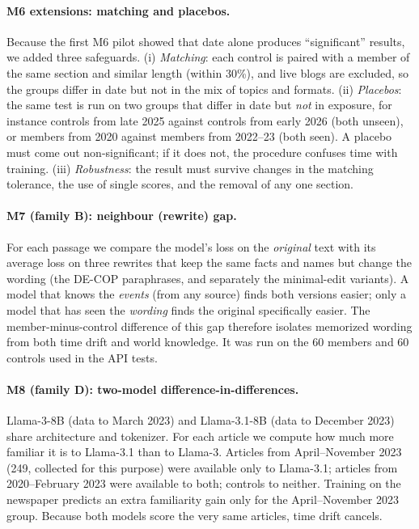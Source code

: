 \documentclass[10pt,a4paper]{article}
\begin{document}
\paragraph{M6 extensions: matching and placebos.} Because the first M6 pilot showed that date alone produces
``significant'' results, we added three safeguards. (i) \emph{Matching}: each control is paired with a member of the
same section and similar length (within 30\%), and live blogs are excluded, so the groups differ in date but not in
the mix of topics and formats. (ii) \emph{Placebos}: the same test is run on two groups that differ in date but
\emph{not} in exposure, for instance controls from late 2025 against controls from early 2026 (both unseen), or
members from 2020 against members from 2022--23 (both seen). A placebo must come out non-significant; if it does not,
the procedure confuses time with training. (iii) \emph{Robustness}: the result must survive changes in the matching
tolerance, the use of single scores, and the removal of any one section.

\paragraph{M7 (family B): neighbour (rewrite) gap.} For each passage we compare the model's loss on the
\emph{original} text with its average loss on three rewrites that keep the same facts and names but change the
wording (the DE-COP paraphrases, and separately the minimal-edit variants). A model that knows the \emph{events}
(from any source) finds both versions easier; only a model that has seen the \emph{wording} finds the original
specifically easier. The member-minus-control difference of this gap therefore isolates memorized wording from both
time drift and world knowledge. It was run on the 60 members and 60 controls used in the API tests.

\paragraph{M8 (family D): two-model difference-in-differences.} Llama-3-8B (data to March 2023) and Llama-3.1-8B
(data to December 2023) share architecture and tokenizer. For each article we compute how much more familiar it is to
Llama-3.1 than to Llama-3. Articles from April--November 2023 (249, collected for this purpose) were available only
to Llama-3.1; articles from 2020--February 2023 were available to both; controls to neither. Training on the
newspaper predicts an extra familiarity gain only for the April--November 2023 group. Because both models score the
very same articles, time drift cancels.
\end{document}
